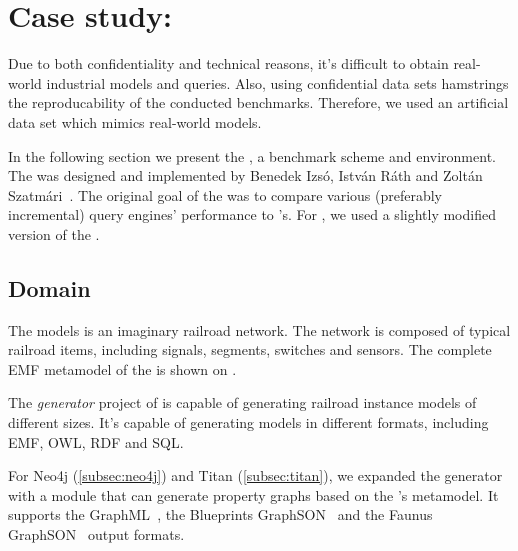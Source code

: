 \section{Case study: \tb{}}
\label{sec:trainbenchmark}

Due to both confidentiality and technical reasons, it's difficult to obtain real-world industrial models and queries. Also, using confidential data sets hamstrings the reproducability of the conducted benchmarks. Therefore, we used an artificial data set which mimics real-world models.  

In the following section we present the \textit{\tb{}}, a benchmark scheme and environment. The \tb{} was designed and implemented by Benedek Izsó, István Ráth and Zoltán Szatmári~\cite{Izso:2012:ODD:2428516.2428523}. The original goal of the \tb{} was to compare various (preferably incremental) query engines' performance to \eiq's. For \iqd, we used a slightly modified version of the \tb{}.

\subsection{Domain}


The \tb{} models is an imaginary railroad network. The network is composed of typical railroad items, including signals, segments, switches and sensors. The complete EMF metamodel of the \tb{} is shown on . 

The \textit{generator} project of \tb{} is capable of generating railroad instance models of different sizes. It's capable of generating models in different formats, including EMF, OWL, RDF and SQL. 

For Neo4j (\autoref{subsec:neo4j}) and Titan (\autoref{subsec:titan}), we expanded the generator with a module that can generate property graphs based on the \tb{}'s metamodel. It supports the GraphML~\cite{GraphML}, the Blueprints GraphSON~\cite{BlueprintsGraphSON} and the Faunus GraphSON~\cite{FaunusGraphSON} output formats.


